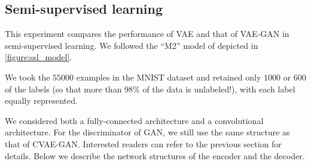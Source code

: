 \documentclass[10pt]{article}
\begin{document}
\subsection{Semi-supervised learning}

This experiment compares the performance of VAE and that of VAE-GAN in semi-supervised learning. We followed the ``M2'' model of \cite{DBLP:journals/corr/KingmaRMW14} depicted in \autoref{figure:ssl_model}.

We took the $55000$ examples in the MNIST dataset and retained only $1000$ or $600$ of the labels (so that more than $98\%$ of the data is unlabeled!), with each label equally represented.

We considered both a fully-connected architecture and a convolutional architecture. For the discriminator of GAN, we still use the same structure as that of CVAE-GAN. Interested readers can refer to the previous section for details. Below we describe the network structures of the encoder and the decoder.
\end{document}
